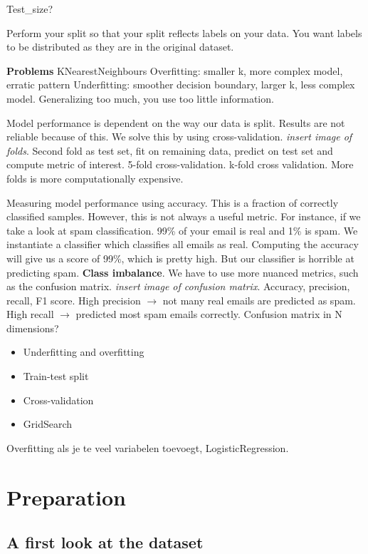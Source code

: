 \documentclass[11pt]{article}
\begin{document}
Test\_size? 

Perform your split so that your split reflects labels on your data. You want labels to be distributed as they are in the original dataset. 

\textbf{Problems}
KNearestNeighbours
Overfitting: smaller k, more complex model, erratic pattern
Underfitting: smoother decision boundary, larger k, less complex model. Generalizing too much, you use too little information.

Model performance is dependent on the way our data is split. Results are not reliable because of this. We solve this by using cross-validation. \emph{insert image of folds}. Second fold as test set, fit on remaining data, predict on test set and compute metric of interest. 5-fold cross-validation. k-fold cross validation. More folds is more computationally expensive. 

Measuring model performance using accuracy. This is a fraction of correctly classified samples. However, this is not always a useful metric. For instance, if we take a look at spam classification. 99\% of your email is real and 1\% is spam. We instantiate a classifier which classifies all emails as real. Computing the accuracy will give us a score of 99\%, which is pretty high. But our classifier is horrible at predicting spam. \textbf{Class imbalance}. We have to use more nuanced metrics, such as the confusion matrix. \emph{insert image of confusion matrix}. Accuracy, precision, recall, F1 score. High precision \(\rightarrow\) not many real emails are predicted as spam. High recall \(\rightarrow\) predicted most spam emails correctly. Confusion matrix in N dimensions? 

\begin{itemize}
\item Underfitting and overfitting
\item Train-test split
\item Cross-validation
\item GridSearch
\end{itemize}


Overfitting als je te veel variabelen toevoegt, LogisticRegression. 


\section{Preparation}
\label{sec:orgbdb9d6b}

\subsection{A first look at the dataset}
\label{sec:orgf0eac19}
\end{document}
